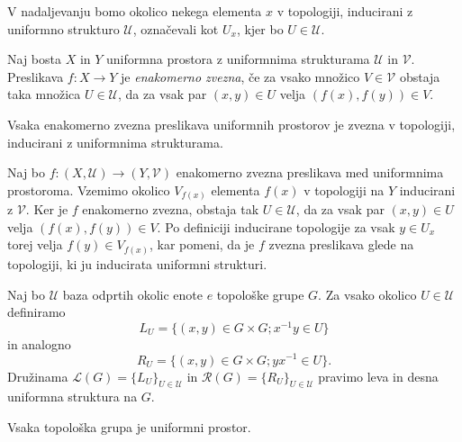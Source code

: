 \documentclass[mat1]{fmfdelo}
\newcommand{\Ucurl}{\mathcal{U}}
\begin{document}
\begin{opomba}
	V nadaljevanju bomo okolico nekega elementa $x$ v topologiji, in\-du\-ci\-ra\-ni z uniformno strukturo $\mathcal{U}$, označevali kot $U_x$, kjer bo $U \in \mathcal{U}$.
\end{opomba}

\begin{definicija}\label{def:enakzveznost}
	Naj bosta $X$ in $Y$ uniformna prostora z uniformnima strukturama $\mathcal{U}$ in $\mathcal{V}$. Preslikava $f: X \to Y$ je \emph{enakomerno zvezna}, če za vsako množico $V \in \mathcal{V}$ obstaja taka množica $U \in \mathcal{U}$, da za vsak par $(x, y) \in U$ velja $(f(x), f(y)) \in V$.
\end{definicija}

\begin{trditev}\label{trd:enakzveznazvezna}
	Vsaka enakomerno zvezna preslikava uniformnih prostorov je zvezna v topologiji, inducirani z uniformnima strukturama.
\end{trditev}

\begin{dokaz}
	Naj bo $f\colon (X, \mathcal{U}) \to (Y, \mathcal{V})$ enakomerno zvezna preslikava med uniformnima prostoroma. Vzemimo okolico $V_{f(x)}$ elementa $f(x)$ v topologiji na $Y$ inducirani z $\mathcal{V}$. Ker je $f$ enakomerno zvezna, obstaja tak $U \in \mathcal{U}$, da za vsak par $(x, y) \in U$ velja $(f(x), f(y)) \in V$. Po definiciji inducirane topologije za vsak $y \in U_x$ torej velja $f(y) \in V_{f(x)}$, kar pomeni, da je $f$ zvezna preslikava glede na topologiji, ki ju inducirata uniformni strukturi.
\end{dokaz}

\begin{definicija}\label{def:levadesnauni}
	Naj bo $\Ucurl$ baza odprtih okolic enote $e$ topološke grupe $G$. Za vsako okolico $U \in \Ucurl$ definiramo \[L_U = \lbrace (x, y) \in G \times G ; x^{-1}y \in U \rbrace\] in analogno \[R_U = \lbrace (x, y) \in G \times G ; yx^{-1} \in U \rbrace.\] Družinama $\mathcal{L}(G) = \lbrace L_U \rbrace_{U \in \Ucurl}$ in $\mathcal{R}(G) = \lbrace R_U \rbrace_{U \in \Ucurl}$ pravimo leva in desna uniformna struktura na $G$.
\end{definicija}

\begin{trditev}\label{trd:topguniform}
	Vsaka topološka grupa je uniformni prostor.
\end{trditev}
\end{document}
